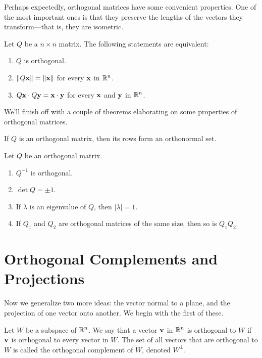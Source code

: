 \documentclass[../m73main.tex]{subfiles}
\begin{document}
Perhaps expectedly, orthogonal matrices have some convenient properties.
One of the most important ones is that they preserve the lengths of the vectors they transform---that is, they are isometric.

\begin{theorem}
	Let $Q$ be a $n \times n$ matrix.
	The following statements are equivalent:
	\begin{enumerate}[label=(\alph*)]
		\item $Q$ is orthogonal.
		\item $\|Q \mathbf{x}\| = \|\mathbf{x}\|$ for every $\mathbf{x}$ in $\mathbb{R}^n$.
		\item $Q \mathbf{x} \cdot Q \mathbf{y} = \mathbf{x} \cdot \mathbf{y}$ for every $\mathbf{x}$ and $\mathbf{y}$ in $\mathbb{R}^n$.
	\end{enumerate}
\end{theorem}

We'll finish off with a couple of theorems elaborating on some properties of orthogonal matrices.

\begin{theorem}
	If $Q$ is an orthogonal matrix, then its rows form an orthonormal set.
\end{theorem}

\begin{theorem}
	Let $Q$ be an orthogonal matrix.
	\begin{enumerate}[label=(\alph*)]
		\item $Q^{-1}$ is orthogonal.
		\item $\det Q = \pm 1$.
		\item If $\lambda$ is an eigenvalue of $Q$, then $|\lambda| = 1$.
		\item If $Q_1$ and $Q_2$ are orthogonal matrices of the same size, then so is $Q_1 Q_2$.
	\end{enumerate}
\end{theorem}

\section{Orthogonal Complements and Projections}
Now we generalize two more ideas: the vector normal to a plane, and the projection of one vector onto another.           
We begin with the first of these.

\begin{definition}
	Let $W$ be a subspace of $\mathbb{R}^n$.
	We say that a vector $\mathbf{v}$ in $\mathbb{R}^n$ is orthogonal to $W$ if $\mathbf{v}$ is orthogonal to every vector in $W$.
	The set of all vectors that are orthogonal to $W$ is called the orthogonal complement of $W$, denoted $W^\perp$.
\end{definition}
\end{document}

